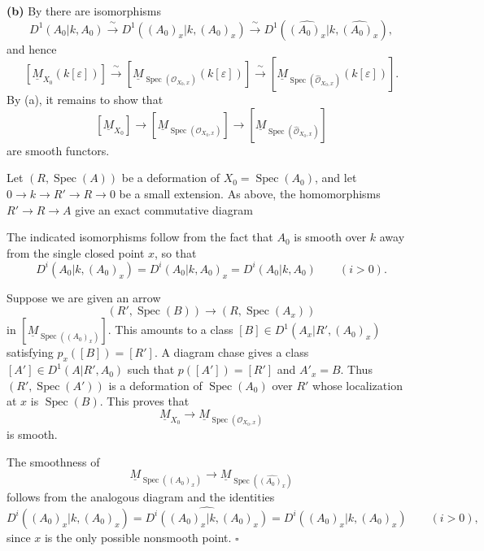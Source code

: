 \smallskip
\noindent\textbf{(b)}
By  there are isomorphisms
\[
D^1(A_0|k,A_0)
\xrightarrow{\ \sim\ }
D^1((A_0)_x|k,(A_0)_x)
\xrightarrow{\ \sim\ }
D^1(\widehat{(A_0)_x}|k,\widehat{(A_0)_x}),
\]
and hence
\[
[\underline M_{X_0}(k[\varepsilon])]
\xrightarrow{\ \sim\ }
[\underline M_{\operatorname{Spec}(\mathcal O_{X_0,x})}
 (k[\varepsilon])]
\xrightarrow{\ \sim\ }
[\underline M_{\operatorname{Spec}(\widehat{\mathcal O}_{X_0,x})}
 (k[\varepsilon])].
\]
By (a), it remains to show that
\[
[\underline M_{X_0}]
\longrightarrow
[\underline M_{\operatorname{Spec}(\mathcal O_{X_0,x})}]
\longrightarrow
[\underline M_{\operatorname{Spec}(\widehat{\mathcal O}_{X_0,x})}]
\]
are smooth functors.

Let $(R,\operatorname{Spec}(A))$ be a deformation of
$X_0=\operatorname{Spec}(A_0)$, and let
$0\longrightarrow k\longrightarrow R'\longrightarrow R
\longrightarrow0$ be a small extension. As above, the homomorphisms
$R'\longrightarrow R\longrightarrow A$ give an exact commutative
diagram


\begin{center}
\scriptsize
{}
\end{center}
The indicated isomorphisms follow from the fact that $A_0$ is smooth
over $k$ away from the single closed point $x$, so that
\[
D^i(A_0|k,(A_0)_x)
=D^i(A_0|k,A_0)_x
=D^i(A_0|k,A_0)
\qquad(i>0).
\]

Suppose we are given an arrow
\[
(R',\operatorname{Spec}(B))
\longrightarrow(R,\operatorname{Spec}(A_x))
\]
in $[\underline M_{\operatorname{Spec}((A_0)_x)}]$. This amounts to
a class $[B]\in D^1(A_x|R',(A_0)_x)$ satisfying
$p_x([B])=[R']$. A diagram chase gives a class
$[A']\in D^1(A|R',A_0)$ such that $p([A'])=[R']$ and $A'_x=B$.
Thus $(R',\operatorname{Spec}(A'))$ is a deformation of
$\operatorname{Spec}(A_0)$ over $R'$ whose localization at $x$ is
$\operatorname{Spec}(B)$. This proves that
\[
\underline M_{X_0}\longrightarrow
\underline M_{\operatorname{Spec}(\mathcal O_{X_0,x})}
\]
is smooth.

The smoothness of
\[
\underline M_{\operatorname{Spec}((A_0)_x)}
\longrightarrow
\underline M_{\operatorname{Spec}(\widehat{(A_0)_x})}
\]
follows from the analogous diagram and the identities
\[
D^i((A_0)_x|k,\widehat{(A_0)_x})
=\widehat{D^i((A_0)_x|k,(A_0)_x)}
=D^i((A_0)_x|k,(A_0)_x)
\qquad(i>0),
\]
since $x$ is the only possible nonsmooth point. \hfill$\square$
